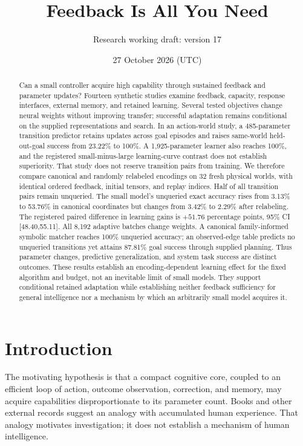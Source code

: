 \documentclass[11pt]{article}
\title{Feedback Is All You Need}
\author{Research working draft: version 17}
\date{27 October 2026 (UTC)}
\begin{document}
\maketitle
\begin{abstract}
Can a small controller acquire high capability through sustained feedback and
parameter updates? Fourteen synthetic studies examine feedback, capacity,
response interfaces, external memory, and retained learning. Several tested
objectives change neural weights without improving transfer; successful
adaptation remains conditional on the supplied representations and search.
In an action-world study, a 485-parameter transition predictor retains updates
across goal episodes and raises same-world held-out-goal success from 23.22\%
to 100\%. A 1,925-parameter learner also reaches 100\%, and the registered
small-minus-large learning-curve contrast does not establish superiority.
That study does not reserve transition pairs from training. We therefore
compare canonical and randomly relabeled encodings on 32 fresh physical
worlds, with identical ordered feedback, initial tensors, and replay indices.
Half of all transition pairs remain unqueried. The small model's unqueried
exact accuracy rises from 3.13\% to 53.76\% in canonical coordinates but
changes from 3.42\% to 2.29\% after relabeling. The registered paired difference
in learning gains is $+51.76$ percentage points, 95\% CI [48.40,55.11].
All 8,192 adaptive batches change weights. A canonical family-informed
symbolic matcher reaches 100\% unqueried accuracy; an observed-edge table
predicts no unqueried transitions yet attains 87.81\% goal success through
supplied planning. Thus parameter changes, predictive generalization, and
system task success are distinct outcomes. These results establish an
encoding-dependent learning effect for the fixed algorithm and budget,
not an inevitable limit of small models. They support conditional retained
adaptation while establishing neither feedback sufficiency for general
intelligence nor a mechanism by which an arbitrarily small model acquires it.
\end{abstract}

\section{Introduction}
The motivating hypothesis is that a compact cognitive core, coupled to an
efficient loop of action, outcome observation, correction, and memory, may
acquire capabilities disproportionate to its parameter count. Books and other
external records suggest an analogy with accumulated human experience. That
analogy motivates investigation; it does not establish a mechanism of human
intelligence.
\end{document}

